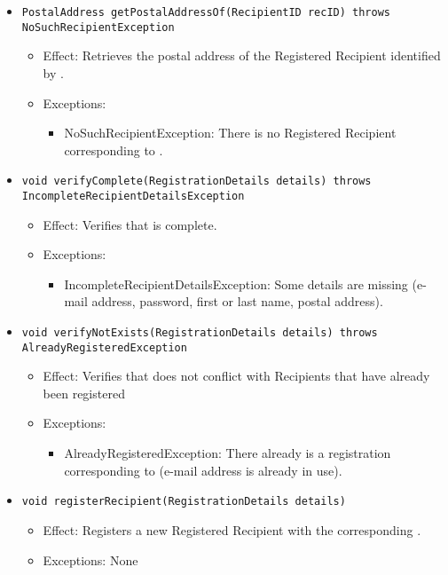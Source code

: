 \begin{itemize}
\begin{itemize}
		\item \texttt{PostalAddress getPostalAddressOf(RecipientID recID) throws NoSuchRecipientException}
        \begin{itemize}
            \item Effect: Retrieves the postal address of the Registered Recipient identified by .
            \item Exceptions:
			\begin{itemize}
				\item NoSuchRecipientException: There is no Registered Recipient corresponding to .
			\end{itemize}
        \end{itemize}

		\item \texttt{void verifyComplete(RegistrationDetails details) throws IncompleteRecipientDetailsException}
        \begin{itemize}
            \item Effect: Verifies that  is complete.
            \item Exceptions:
			\begin{itemize}
				\item IncompleteRecipientDetailsException: Some details are missing (e-mail address, password, first or last name, postal address).
			\end{itemize}
        \end{itemize}
		
        \item \texttt{void verifyNotExists(RegistrationDetails details) throws AlreadyRegisteredException}
        \begin{itemize}
            \item Effect: Verifies that  does not conflict with Recipients that have already been registered
            \item Exceptions:
			\begin{itemize}
				\item AlreadyRegisteredException: There already is a registration corresponding to  (e-mail address is already in use).
			\end{itemize}
        \end{itemize}

		\item \texttt{void registerRecipient(RegistrationDetails details)}
        \begin{itemize}
            \item Effect: Registers a new Registered Recipient with the corresponding .
            \item Exceptions: None
        \end{itemize}
    \end{itemize}


\end{itemize}
